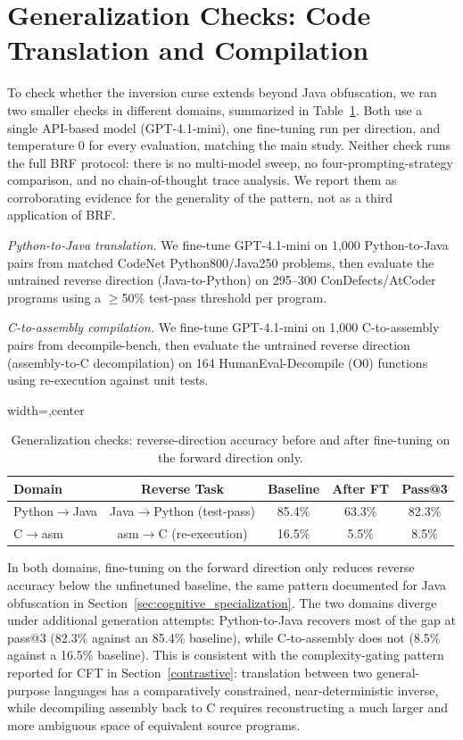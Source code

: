 
\section{Generalization Checks: Code Translation and Compilation}
\label{appendix:generalization}

To check whether the inversion curse extends beyond Java obfuscation, we
ran two smaller checks in different domains, summarized in
Table~\ref{tab:generalization_checks}. Both use a single API-based model
(GPT-4.1-mini), one fine-tuning run per direction, and temperature 0 for
every evaluation, matching the main study. Neither check runs the full BRF
protocol: there is no multi-model sweep, no four-prompting-strategy
comparison, and no chain-of-thought trace analysis. We report them as
corroborating evidence for the generality of the pattern, not as a third
application of BRF.

\textit{Python-to-Java translation.} We fine-tune GPT-4.1-mini on 1,000
Python-to-Java pairs from matched CodeNet Python800/Java250 problems, then
evaluate the untrained reverse direction (Java-to-Python) on 295--300
ConDefects/AtCoder programs using a $\geq$50\% test-pass threshold per
program.

\textit{C-to-assembly compilation.} We fine-tune GPT-4.1-mini on 1,000
C-to-assembly pairs from decompile-bench, then evaluate the untrained reverse
direction (assembly-to-C decompilation) on 164 HumanEval-Decompile (O0)
functions using re-execution against unit tests.

\begin{table}[htbp]
\centering
\caption{Generalization checks: reverse-direction accuracy before and after
fine-tuning on the forward direction only.}
\label{tab:generalization_checks}
\begin{adjustbox}{width=\columnwidth,center}
\begin{tabular}{@{}lcccc@{}}
\toprule
\textbf{Domain} & \textbf{Reverse Task} & \textbf{Baseline} & \textbf{After FT} & \textbf{Pass@3} \\ \midrule
Python$\to$Java & Java$\to$Python (test-pass) & 85.4\% & 63.3\% & 82.3\% \\
C$\to$asm & asm$\to$C (re-execution) & 16.5\% & 5.5\% & 8.5\% \\ \bottomrule
\end{tabular}
\end{adjustbox}
\end{table}

In both domains, fine-tuning on the forward direction only reduces reverse
accuracy below the unfinetuned baseline, the same pattern documented for Java
obfuscation in Section~\ref{sec:cognitive_specialization}. The two domains
diverge under additional generation attempts: Python-to-Java recovers most
of the gap at pass@3 (82.3\% against an 85.4\% baseline), while C-to-assembly
does not (8.5\% against a 16.5\% baseline). This is consistent with the
complexity-gating pattern reported for CFT in Section~\ref{contrastive}:
translation between two general-purpose languages has a comparatively
constrained, near-deterministic inverse, while decompiling assembly back to
C requires reconstructing a much larger and more ambiguous space of
equivalent source programs.
